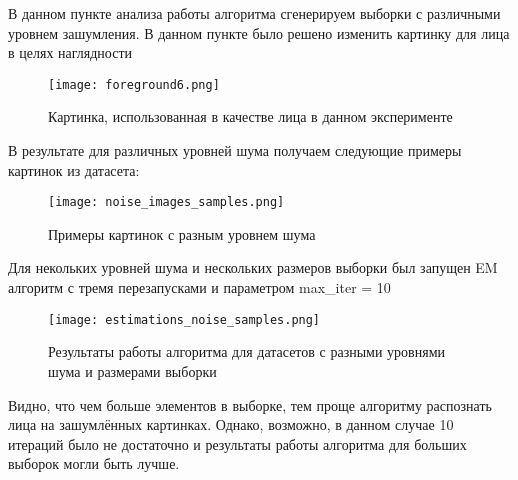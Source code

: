 В данном пункте анализа работы алгоритма сгенерируем выборки с различными уровнем зашумления. В данном пункте было решено изменить картинку для лица в целях наглядности

\begin{figure}[H]
	\label{smile_fg}
	\texttt{[image: foreground6.png]}
	\centering
	\caption{Картинка, использованная в качестве лица в данном эксперименте}
\end{figure}

В результате для различных уровней шума получаем следующие примеры картинок из датасета:

\begin{figure}[H]
	\label{noise_images_samples}
	\texttt{[image: noise\_images\_samples.png]}
	\centering
	\caption{Примеры картинок с разным уровнем шума}
\end{figure}

Для некольких уровней шума и нескольких размеров выборки был запущен EM алгоритм с тремя перезапусками и параметром max\_iter = 10 

\begin{figure}[H]
	\label{estimations_noise_samples}
	\texttt{[image: estimations\_noise\_samples.png]}
	\centering
	\caption{Результаты работы алгоритма для датасетов с разными уровнями шума и размерами выборки}
\end{figure}

Видно, что чем больше элементов в выборке, тем проще алгоритму распознать лица на зашумлённых картинках. Однако, возможно, в данном случае 10 итераций было не достаточно и результаты работы алгоритма для больших выборок могли быть лучше.